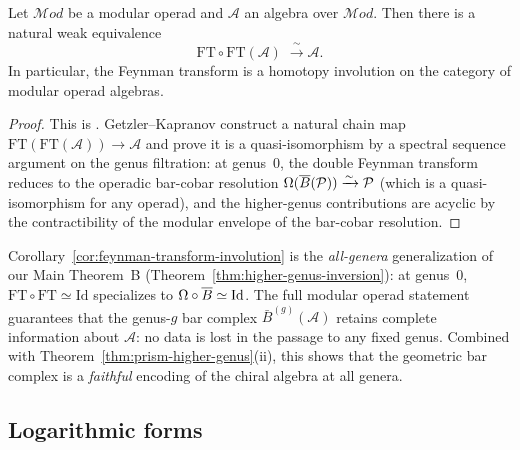 \begin{corollary}%
\label{cor:feynman-transform-involution}
Let $\mathcal{M}od$ be a modular operad and $\mathcal{A}$ an algebra
over $\mathcal{M}od$.  Then there is a natural weak equivalence
\begin{equation}\label{eq:ft-involution}
\mathrm{FT} \circ \mathrm{FT}(\mathcal{A})
\;\xrightarrow{\;\sim\;}
\mathcal{A}.
\end{equation}
In particular, the Feynman transform is a homotopy involution on
the category of modular operad algebras.
\end{corollary}

\begin{proof}
This is \cite[Theorem~5.4]{GeK98}.  Getzler--Kapranov construct
a natural chain map
$\mathrm{FT}(\mathrm{FT}(\mathcal{A})) \to \mathcal{A}$
and prove it is a quasi-isomorphism by a spectral sequence argument
on the genus filtration: at genus~$0$, the double Feynman transform
reduces to the operadic bar-cobar resolution
$\Omega(\overline{B}(\mathcal{P})) \xrightarrow{\sim} \mathcal{P}$
(which is a quasi-isomorphism for any operad), and the higher-genus
contributions are acyclic by the contractibility of the modular
envelope of the bar-cobar resolution.
\end{proof}

\begin{remark}\label{rem:ft-vs-bar-cobar}
Corollary~\ref{cor:feynman-transform-involution} is the
\emph{all-genera} generalization of our Main Theorem~B
(Theorem~\ref{thm:higher-genus-inversion}): at genus~$0$,
$\mathrm{FT} \circ \mathrm{FT} \simeq \mathrm{Id}$ specializes
to $\Omega \circ \overline{B} \simeq \mathrm{Id}$.  The full modular
operad statement guarantees that the genus-$g$ bar complex
$\bar{B}^{(g)}(\mathcal{A})$ retains complete information about
$\mathcal{A}$: no data is lost in the passage to any fixed genus.
Combined with Theorem~\ref{thm:prism-higher-genus}(ii), this shows
that the geometric bar complex is a \emph{faithful} encoding of the
chiral algebra at all genera.
\end{remark}

\subsection{Logarithmic forms}

